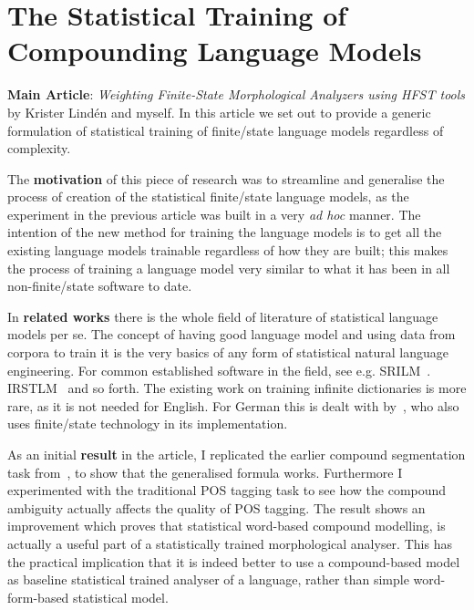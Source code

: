 \documentclass[officiallayout]{unihelcompling}
\begin{document}
\section{The Statistical Training of Compounding Language Models}
\label{sec:training-compounds}

\textbf{Main Article}: \emph{Weighting Finite-State Morphological Analyzers
using HFST tools} by Krister Lindén and myself. In this article we set out
to provide a generic formulation of statistical training of finite\-/state
language models regardless of complexity.

The \textbf{motivation} of this piece of research was to streamline and generalise
the process of creation of the statistical finite\-/state language models, as the
experiment in the previous article  was built
in a very \emph{ad hoc} manner. The intention of the new method for training the
language models is to get all the existing language models trainable regardless
of how they are built; this makes the process of training a language model very
similar to what it has been in all non-finite\-/state software to date.

In \textbf{related works} there is the whole field of literature of statistical
language models per se. The concept of having good language model and using
data from corpora to train it is the very basics of any form of statistical
natural language engineering. For common established software in the field, see
e.g.  SRILM~\citep{stolcke2002srilm}. IRSTLM~\citep{federico2008irstlm} and so
forth.  The existing work on training infinite dictionaries is more rare, as it
is not needed for English. For German this is dealt with
by~\citet{schiller2006german}, who also uses finite\-/state technology in its
implementation.

As an initial \textbf{result} in the article, I replicated the earlier compound
segmentation task from~, to show that the generalised formula works.
Furthermore I experimented with the traditional POS tagging task to see how the
compound ambiguity actually affects the quality of POS tagging. The result
shows an improvement which proves that statistical word-based compound
modelling, is actually a useful part of a statistically trained morphological
analyser. This has the practical implication that it is indeed better to
use a compound-based model as baseline statistical trained analyser
of a language, rather than simple word-form-based statistical model.
\end{document}
